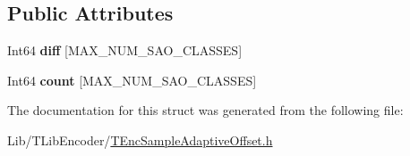 \subsection*{Public Attributes}
\begin{DoxyCompactItemize}
\item 
\mbox{\label{struct_s_a_o_stat_data_a30fd6c987d72c378dcc6328c09f32657}} 
Int64 {\bfseries diff} \mbox{[}M\+A\+X\+\_\+\+N\+U\+M\+\_\+\+S\+A\+O\+\_\+\+C\+L\+A\+S\+S\+ES\mbox{]}
\item 
\mbox{\label{struct_s_a_o_stat_data_af971f5977aafb969bac60b506edaf33c}} 
Int64 {\bfseries count} \mbox{[}M\+A\+X\+\_\+\+N\+U\+M\+\_\+\+S\+A\+O\+\_\+\+C\+L\+A\+S\+S\+ES\mbox{]}
\end{DoxyCompactItemize}


The documentation for this struct was generated from the following file\+:\begin{DoxyCompactItemize}
\item 
Lib/\+T\+Lib\+Encoder/\hyperlink{_t_enc_sample_adaptive_offset_8h}{T\+Enc\+Sample\+Adaptive\+Offset.\+h}\end{DoxyCompactItemize}
